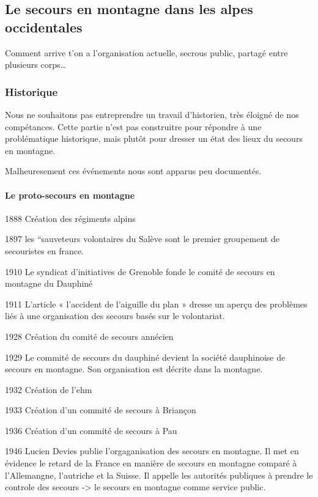 \subsection{Le secours en montagne dans les alpes occidentales}
\label{subsec:1-1-1}

Comment arrive t'on a l'organisation actuelle, secrous public, partagé
entre plusieurs corps…

\subsubsection{Historique}
\label{subsubsec:1-1-1-1}

Nous ne souhaitons pas entreprendre un travail d'historien, très
éloigné de nos compétances. Cette partie n'est pas construitre pour
répondre à une problématique historique, mais plutôt pour dresser un
état des lieux du secours en montagne.

Malheuresement ces événements nous sont apparus peu documentés.

\paragraph{Le proto-secours en montagne}
\label{par:1-1-1-1-1}

1888 Création des régiments alpins

1897 les ``sauveteurs volontaires du Salève sont le premier groupement
de secouristes en france.

1910 Le syndicat d'initiatives de Grenoble fonde le comité de secours
en montagne du Dauphiné

1911 L'article « l'accident de l'aiguille du plan » dresse un aperçu
des problèmes liés à une organisation des secours basés sur le
volontariat.

1928 Création du comité de secours annécien

1929 Le commité de secours du dauphiné devient la société dauphinoise
de secours en montagne. Son organisation est décrite dans la montagne.

1932 Création de l'\ac{ehm}

1933 Création d'un commité de secours à Briançon

1936 Création d'un commité de secours à Pau

1946 Lucien Devies publie l'orgaganisation des secours en montagne. Il
met en évidence le retard de la France en manière de secours en
montagne comparé à l'Allemangne, l'autriche et la Suisse. Il appelle
les autorités publiques à prendre le controle des secours -> le
secours en montagne comme service public.

